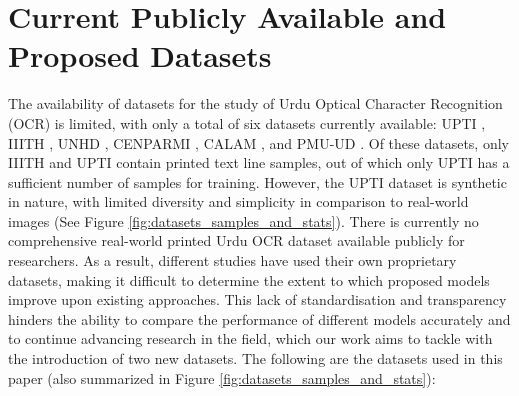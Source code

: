 \documentclass[runningheads]{llncs}
\begin{document}
\section{Current Publicly Available and Proposed Datasets}
\label{section:dataset_section}

The availability of datasets for the study of Urdu Optical Character Recognition (OCR) is limited, with only a total of six datasets currently available: UPTI \cite{upti_paper}, IIITH \cite{iiith17urdu}, UNHD \cite{unhd_paper}, CENPARMI \cite{cenparmi_paper}, CALAM \cite{calam_paper}, and PMU-UD \cite{pmu_ud_paper}. Of these datasets, only IIITH and UPTI contain printed text line samples, out of which only UPTI has a sufficient number of samples for training. However, the UPTI dataset is synthetic in nature, with limited diversity and simplicity in comparison to real-world images (See Figure \ref{fig:datasets_samples_and_stats}). There is currently no comprehensive real-world printed Urdu OCR dataset available publicly for researchers. As a result, different studies have used their own proprietary datasets, making it difficult to determine the extent to which proposed models improve upon existing approaches. This lack of standardisation and transparency hinders the ability to compare the performance of different models accurately and to continue advancing research in the field, which our work aims to tackle with the introduction of two new datasets. The following are the datasets used in this paper (also summarized in Figure \ref{fig:datasets_samples_and_stats}):
\end{document}
